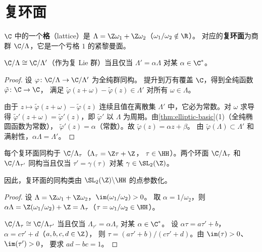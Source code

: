 \section{复环面}
\label{sec:complex-tori}

\begin{definition}[格与复环面]
\label{def:lattice-torus}
$\C$ 中的一个\textbf{格}（lattice）是
$\Lambda = \Z\omega_1 + \Z\omega_2$（$\omega_1/\omega_2 \notin \R$）。
对应的\textbf{复环面}为商群 $\C/\Lambda$，它是一个亏格 $1$ 的紧黎曼面。
\end{definition}

\begin{proposition}[复环面的同构分类]
\label{prop:torus-isomorphism}
$\C/\Lambda \cong \C/\Lambda'$（作为复 Lie 群）当且仅当
$\Lambda' = \alpha\Lambda$ 对某 $\alpha \in \C^*$。
\end{proposition}

\begin{proof}
设 $\varphi\colon \C/\Lambda \to \C/\Lambda'$ 为全纯群同构。
提升到万有覆盖 $\C$，得到全纯函数 $\tilde\varphi\colon \C \to \C$，
满足 $\tilde\varphi(z + \omega) - \tilde\varphi(z) \in \Lambda'$ 对所有
$\omega \in \Lambda$。

由于 $z \mapsto \tilde\varphi(z + \omega) - \tilde\varphi(z)$ 连续且值在离散集
$\Lambda'$ 中，它必为常数。对 $\omega$ 求导得
$\tilde\varphi'(z + \omega) = \tilde\varphi'(z)$，即 $\tilde\varphi'$ 以 $\Lambda$
为周期。由\cref{thm:elliptic-basic}(1)（全纯椭圆函数为常数），
$\tilde\varphi'(z) = \alpha$（常数）。故 $\tilde\varphi(z) = \alpha z + \beta$。
由 $\tilde\varphi(\Lambda) \subset \Lambda'$ 和满射性，$\alpha\Lambda = \Lambda'$。
\end{proof}

\begin{corollary}
\label{cor:torus-tau}
每个复环面同构于 $\C/\Lambda_\tau$（$\Lambda_\tau = \Z\tau + \Z$，
$\tau \in \HH$）。两个环面 $\C/\Lambda_\tau$ 和 $\C/\Lambda_{\tau'}$
同构当且仅当 $\tau' = \gamma(\tau)$ 对某 $\gamma \in \SL_2(\Z)$。

因此，复环面的同构类由 $\SL_2(\Z) \backslash \HH$ 的点参数化。
\end{corollary}

\begin{proof}
设 $\Lambda = \Z\omega_1 + \Z\omega_2$，$\im(\omega_1/\omega_2) > 0$。
取 $\alpha = 1/\omega_2$，则 $\alpha\Lambda = \Z(\omega_1/\omega_2) + \Z
= \Lambda_\tau$（$\tau = \omega_1/\omega_2 \in \HH$）。

$\C/\Lambda_\tau \cong \C/\Lambda_{\tau'}$ 当且仅当
$\Lambda_{\tau'} = \alpha \Lambda_\tau$ 对某 $\alpha \in \C^*$。
设 $\alpha \tau = a\tau' + b$，$\alpha = c\tau' + d$（$a,b,c,d \in \Z$），
则 $\tau = (a\tau' + b)/(c\tau' + d)$。由 $\im(\tau) > 0$、$\im(\tau') > 0$，
要求 $ad - bc = 1$。
\end{proof}


